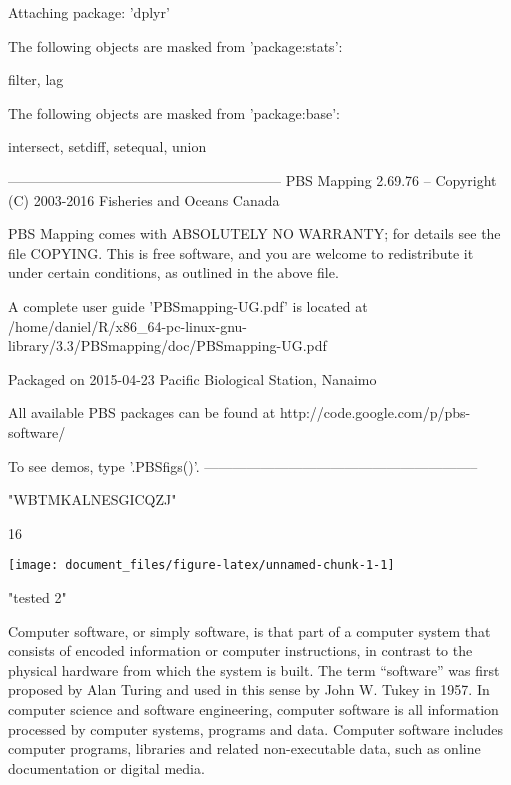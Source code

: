 \documentclass[nojss,shortnames]{jss}
\begin{document}
\begin{CodeChunk}
\begin{CodeOutput}

Attaching package: 'dplyr'
\end{CodeOutput}
\begin{CodeOutput}
The following objects are masked from 'package:stats':

    filter, lag
\end{CodeOutput}
\begin{CodeOutput}
The following objects are masked from 'package:base':

    intersect, setdiff, setequal, union
\end{CodeOutput}
\begin{CodeOutput}

-----------------------------------------------------------
PBS Mapping 2.69.76 -- Copyright (C) 2003-2016 Fisheries and Oceans Canada

PBS Mapping comes with ABSOLUTELY NO WARRANTY;
for details see the file COPYING.
This is free software, and you are welcome to redistribute
it under certain conditions, as outlined in the above file.

A complete user guide 'PBSmapping-UG.pdf' is located at 
/home/daniel/R/x86_64-pc-linux-gnu-library/3.3/PBSmapping/doc/PBSmapping-UG.pdf

Packaged on 2015-04-23
Pacific Biological Station, Nanaimo

All available PBS packages can be found at
http://code.google.com/p/pbs-software/

To see demos, type '.PBSfigs()'.
-----------------------------------------------------------
\end{CodeOutput}
\begin{CodeOutput}
[1] "WBTMKALNESGICQZJ"
\end{CodeOutput}
\begin{CodeOutput}
[1] 16
\end{CodeOutput}


\begin{center}\texttt{[image: document\_files/figure-latex/unnamed-chunk-1-1]} \end{center}

\begin{CodeOutput}
[1] "tested 2"
\end{CodeOutput}
\end{CodeChunk}

Computer software, or simply software, is that part of a computer system
that consists of encoded information or computer instructions, in
contrast to the physical hardware from which the system is built. The
term ``software'' was first proposed by Alan Turing and used in this
sense by John W. Tukey in 1957. In computer science and software
engineering, computer software is all information processed by computer
systems, programs and data. Computer software includes computer
programs, libraries and related non-executable data, such as online
documentation or digital media.
\end{document}
